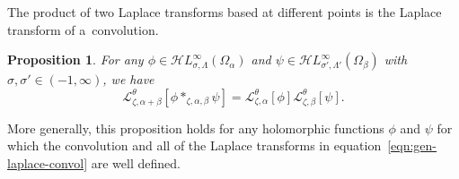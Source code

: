 \documentclass[10pt,a4paper]{amsart}
\newcommand{\singexp}[2]{\mathcal{H}L^\infty_{#1, #2}}
\newcommand{\laplace}{\mathcal{L}}
\numberwithin{equation}{section}
\newtheorem{Proposition}[Theorem]{Proposition}
 { \theoremstyle{definition}
\newtheorem{Definition}[Theorem]{Definition}
\newtheorem{Remark}[Theorem]{Remark}
\newtheorem*{notation*}{Notation}
}
\begin{document}
The product of two Laplace transforms based at different points is the Laplace transform of a~convolution.
\begin{Proposition}
For any $\phi\in\singexp{\sigma}{\Lambda}(\Omega_\alpha)$ and $\psi\in\singexp{\sigma'}{\Lambda'}(\Omega_\beta)$ with $\sigma,\sigma'\in (-1,\infty)$, we have
\begin{equation}\label{eqn:gen-laplace-convol}
\laplace^\theta_{\zeta,\alpha+\beta}[\phi \ast_{\zeta,\alpha,\beta} \psi] = \laplace^\theta_{\zeta,\alpha}[\phi] \laplace^\theta_{\zeta,\beta}[\psi].
\end{equation}
\end{Proposition}
More generally, this proposition holds for any holomorphic functions $\phi$ and $\psi$ for which the convolution and all of the Laplace transforms in equation~\eqref{eqn:gen-laplace-convol} are well defined.
\end{document}
